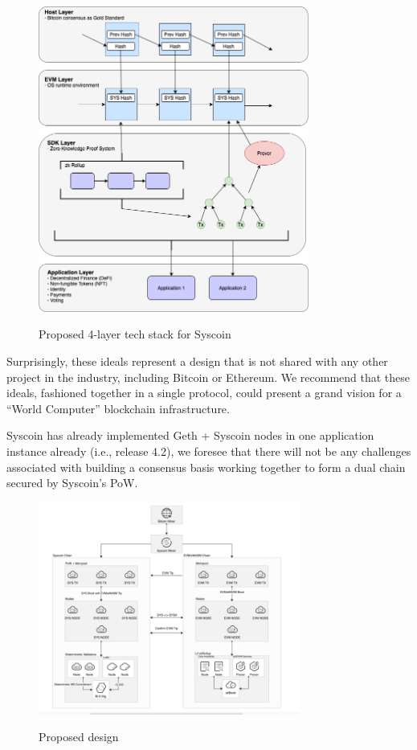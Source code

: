 \documentclass[peerreview]{ieeesyscoin}
\begin{document}
\begin{figure}[h!]
\includegraphics[width=3.5in]{img/4_layer.png}
\label{fig:tech_stack}
\caption{Proposed 4-layer tech stack for Syscoin} 
\end{figure} 

Surprisingly, these ideals represent a design that is not shared with any other project in the industry, including Bitcoin or Ethereum. We recommend that these ideals, fashioned together in a single protocol, could present a grand vision for a “World Computer” blockchain infrastructure.

Syscoin has already implemented Geth + Syscoin nodes in one application instance already (i.e., release 4.2), we foresee that there will not be any challenges associated with building a consensus basis working together to form a dual chain secured by Syscoin’s PoW.

\begin{figure}[h!]
\includegraphics[width=3.4in]{img/fig_5.png}
\label{fig:proposed_design}
\caption{Proposed design} 
\end{figure} 
\end{document}
